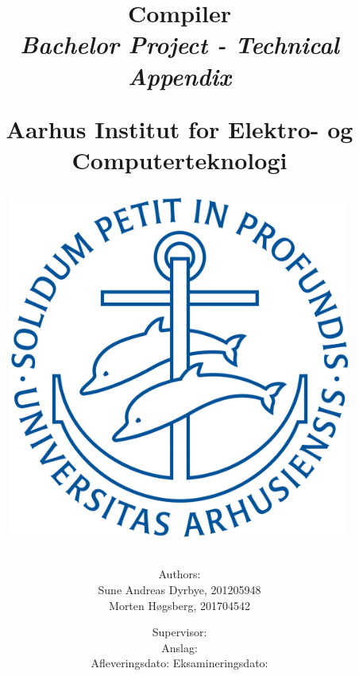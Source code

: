 \newcommand{\authorName}{}
\newcommand{\titleName}{Compiler}
\newcommand{\subject}{Bachelor Project - Technical Appendix}
\newcommand{\vejleder}{Supervisor: }
\newcommand{\institute}{Aarhus Institut for Elektro- og Computerteknologi}
\begin{titlepage}
  \centering
    \title
    {
      \Huge \textbf{\titleName}\\
      \scale{\numberSQRTTWO}{\vspace{\sol pt}}
      \LARGE \textit{\subject}
      \scale{\numberSQRTTWO}{\rule{\linewidth}{\sol pt}}

      \textbf{\institute}

      \begin{figure}[h]
        \centering
        \includegraphics[scale=0.2]{02-Body/Images/Aarhus_University_seal.png}
      \end{figure}

      \author
    {
      \LARGE Authors: \\
      Sune Andreas Dyrbye, 201205948 \\
      Morten Høgsberg, 201704542 \\
      }
           \date{
        \Large \vejleder \\
        \vspace{2em}
        Anslag: \\
        \vspace{2em}
        Afleveringsdato:  \hfill
        Eksamineringsdato: \\
      }


    }
   
\end{titlepage}
